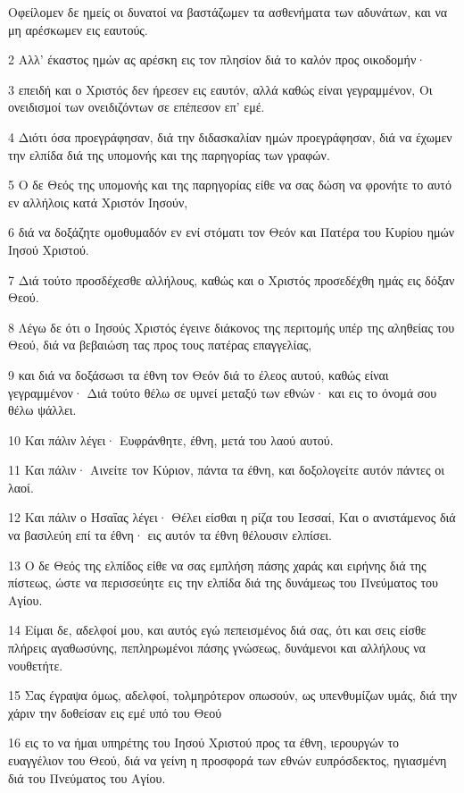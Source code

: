\par Οφείλομεν δε ημείς οι δυνατοί να βαστάζωμεν τα ασθενήματα των αδυνάτων, και να μη αρέσκωμεν εις εαυτούς.
\par 2 Αλλ' έκαστος ημών ας αρέσκη εις τον πλησίον διά το καλόν προς οικοδομήν·
\par 3 επειδή και ο Χριστός δεν ήρεσεν εις εαυτόν, αλλά καθώς είναι γεγραμμένον, Οι ονειδισμοί των ονειδιζόντων σε επέπεσον επ' εμέ.
\par 4 Διότι όσα προεγράφησαν, διά την διδασκαλίαν ημών προεγράφησαν, διά να έχωμεν την ελπίδα διά της υπομονής και της παρηγορίας των γραφών.
\par 5 Ο δε Θεός της υπομονής και της παρηγορίας είθε να σας δώση να φρονήτε το αυτό εν αλλήλοις κατά Χριστόν Ιησούν,
\par 6 διά να δοξάζητε ομοθυμαδόν εν ενί στόματι τον Θεόν και Πατέρα του Κυρίου ημών Ιησού Χριστού.
\par 7 Διά τούτο προσδέχεσθε αλλήλους, καθώς και ο Χριστός προσεδέχθη ημάς εις δόξαν Θεού.
\par 8 Λέγω δε ότι ο Ιησούς Χριστός έγεινε διάκονος της περιτομής υπέρ της αληθείας του Θεού, διά να βεβαιώση τας προς τους πατέρας επαγγελίας,
\par 9 και διά να δοξάσωσι τα έθνη τον Θεόν διά το έλεος αυτού, καθώς είναι γεγραμμένον· Διά τούτο θέλω σε υμνεί μεταξύ των εθνών· και εις το όνομά σου θέλω ψάλλει.
\par 10 Και πάλιν λέγει· Ευφράνθητε, έθνη, μετά του λαού αυτού.
\par 11 Και πάλιν· Αινείτε τον Κύριον, πάντα τα έθνη, και δοξολογείτε αυτόν πάντες οι λαοί.
\par 12 Και πάλιν ο Ησαΐας λέγει· Θέλει είσθαι η ρίζα του Ιεσσαί, Και ο ανιστάμενος διά να βασιλεύη επί τα έθνη· εις αυτόν τα έθνη θέλουσιν ελπίσει.
\par 13 Ο δε Θεός της ελπίδος είθε να σας εμπλήση πάσης χαράς και ειρήνης διά της πίστεως, ώστε να περισσεύητε εις την ελπίδα διά της δυνάμεως του Πνεύματος του Αγίου.
\par 14 Είμαι δε, αδελφοί μου, και αυτός εγώ πεπεισμένος διά σας, ότι και σεις είσθε πλήρεις αγαθωσύνης, πεπληρωμένοι πάσης γνώσεως, δυνάμενοι και αλλήλους να νουθετήτε.
\par 15 Σας έγραψα όμως, αδελφοί, τολμηρότερον οπωσούν, ως υπενθυμίζων υμάς, διά την χάριν την δοθείσαν εις εμέ υπό του Θεού
\par 16 εις το να ήμαι υπηρέτης του Ιησού Χριστού προς τα έθνη, ιερουργών το ευαγγέλιον του Θεού, διά να γείνη η προσφορά των εθνών ευπρόσδεκτος, ηγιασμένη διά του Πνεύματος του Αγίου.
